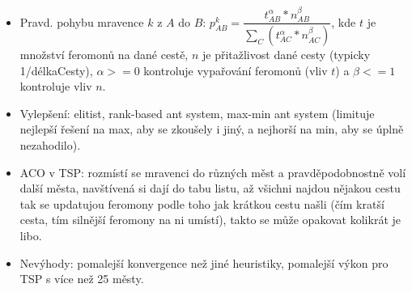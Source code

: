 \documentclass[a4paper,hidelinks]{article}
\begin{document}
\begin{itemize}
\begin{itemize}
            \item Pravd. pohybu mravence $k$ z $A$ do $B$: $p_{AB}^{k}=\dfrac{t_{AB}^\alpha * n_{AB}^\beta}{\sum\limits_{C} (t_{AC}^\alpha*n_{AC}^\beta)}$, kde $t$ je množství feromonů na dané cestě, $n$ je přitažlivost dané cesty (typicky 1/délkaCesty), $\alpha>=0$ kontroluje vypařování feromonů (vliv $t$) a $\beta<=1$ kontroluje vliv $n$.
            \item Vylepšení: elitist, rank-based ant system, max-min ant system (limituje nejlepší řešení na max, aby se zkoušely i jiný, a nejhorší na min, aby se úplně nezahodilo).
            \item ACO v TSP: rozmístí se mravenci do různých měst a pravděpodobnostně volí další města, navštívená si dají do tabu listu, až všichni najdou nějakou cestu tak se updatujou feromony podle toho jak krátkou cestu našli (čím kratší cesta, tím silnější feromony na ni umístí), takto se může opakovat kolikrát je libo.
            \item Nevýhody: pomalejší konvergence než jiné heuristiky, pomalejší výkon pro TSP s více než 25 městy.
        \end{itemize}
\end{itemize}
\end{document}
